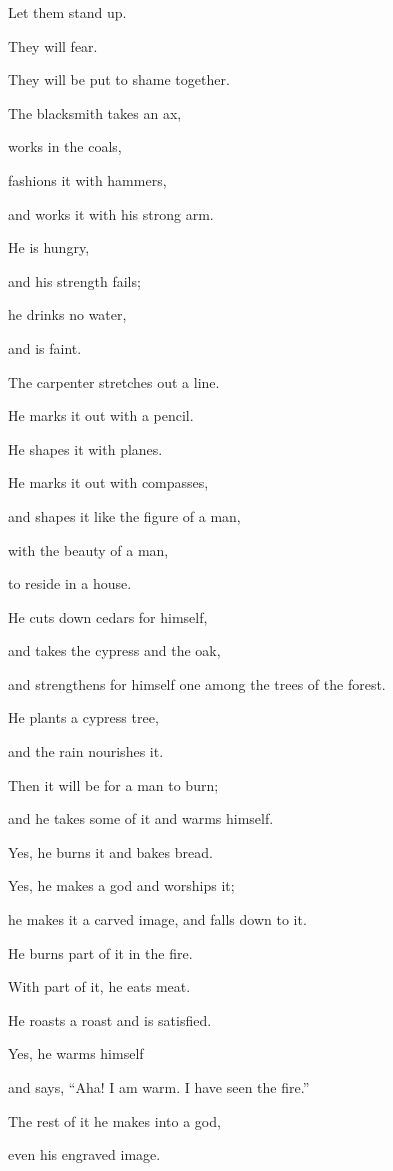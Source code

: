 Let them stand up.

They will fear.

They will be put to shame together.


\vspace{\baselineskip} \myverse{}The blacksmith takes an ax,

works in the coals,

fashions it with hammers,

and works it with his strong arm.

He is hungry,

and his strength fails;

he drinks no water,

and is faint.

\myverse{}The carpenter stretches out a line.

He marks it out with a pencil.

He shapes it with planes.

He marks it out with compasses,

and shapes it like the figure of a man,

with the beauty of a man,

to reside in a house.

\myverse{}He cuts down cedars for himself,

and takes the cypress and the oak,

and strengthens for himself one among the trees of the forest.

He plants a cypress tree,

and the rain nourishes it.

\myverse{}Then it will be for a man to burn;

and he takes some of it and warms himself.

Yes, he burns it and bakes bread.

Yes, he makes a god and worships it;

he makes it a carved image, and falls down to it.

\myverse{}He burns part of it in the fire.

With part of it, he eats meat.

He roasts a roast and is satisfied.

Yes, he warms himself

and says, “Aha! I am warm. I have seen the fire.”

\myverse{}The rest of it he makes into a god,

even his engraved image.


